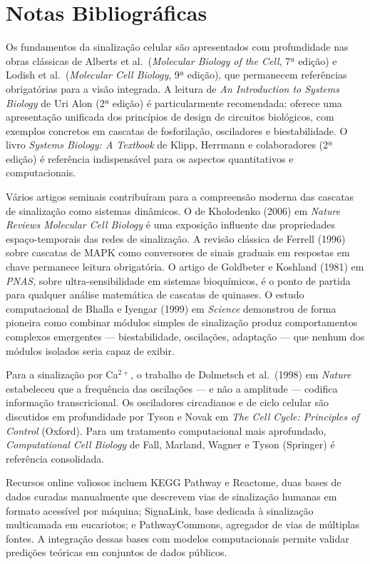 \section{Notas Bibliográficas}
\label{sec:09-bibliografia}

Os fundamentos da sinalização celular são apresentados com profundidade nas
obras clássicas de Alberts et al.\ (\textit{Molecular Biology of the Cell},
7ª edição) e Lodish et al.\ (\textit{Molecular Cell Biology}, 9ª edição),
que permanecem referências obrigatórias para a visão integrada. A leitura
de \textit{An Introduction to Systems Biology} de Uri Alon (2ª edição) é
particularmente recomendada: oferece uma apresentação unificada dos princípios
de design de circuitos biológicos, com exemplos concretos em cascatas de
fosforilação, osciladores e biestabilidade. O livro \textit{Systems Biology: A
Textbook} de Klipp, Herrmann e colaboradores (2ª edição) é referência
indispensável para os aspectos quantitativos e computacionais.

Vários artigos seminais contribuíram para a compreensão moderna das cascatas
de sinalização como sistemas dinâmicos. O de Kholodenko (2006) em
\textit{Nature Reviews Molecular Cell Biology} é uma exposição influente das
propriedades espaço-temporais das redes de sinalização. A revisão clássica de
Ferrell (1996) sobre cascatas de MAPK como conversores de sinais graduais em
respostas em chave permanece leitura obrigatória. O artigo de Goldbeter e
Koshland (1981) em \textit{PNAS}, sobre ultra-sensibilidade em sistemas
bioquímicos, é o ponto de partida para qualquer análise matemática de
cascatas de quinases. O estudo computacional de Bhalla e Iyengar (1999) em
\textit{Science} demonstrou de forma pioneira como combinar módulos simples
de sinalização produz comportamentos complexos emergentes --- biestabilidade,
oscilações, adaptação --- que nenhum dos módulos isolados seria capaz de exibir.

Para a sinalização por Ca$^{2+}$, o trabalho de Dolmetsch et al.\ (1998) em
\textit{Nature} estabeleceu que a frequência das oscilações --- e não a amplitude ---
codifica informação transcricional. Os osciladores circadianos e de ciclo
celular são discutidos em profundidade por Tyson e Novak em \textit{The Cell
Cycle: Principles of Control} (Oxford). Para um tratamento computacional mais
aprofundado, \textit{Computational Cell Biology} de Fall, Marland, Wagner e
Tyson (Springer) é referência consolidada.

Recursos online valiosos incluem KEGG Pathway e Reactome, duas bases de
dados curadas manualmente que descrevem vias de sinalização humanas em
formato acessível por máquina; SignaLink, base dedicada à sinalização
multicamada em eucariotos; e PathwayCommons, agregador de vias de múltiplas
fontes. A integração dessas bases com modelos computacionais permite validar
predições teóricas em conjuntos de dados públicos.


